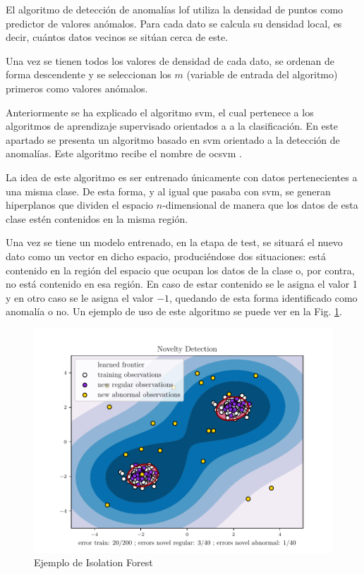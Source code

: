 
El algoritmo de detección de anomalías \acrfull{lof} \cite{cheng2019outlier} utiliza la densidad de puntos como predictor de valores anómalos. Para cada dato se calcula su densidad local, es decir, cuántos datos vecinos se sitúan cerca de este.

Una vez se tienen todos los valores de densidad de cada dato, se ordenan de forma descendente y se seleccionan los $m$ (variable de entrada del algoritmo) primeros como valores anómalos.


Anteriormente se ha explicado el algoritmo \acrshort{svm}, el cual pertenece a los algoritmos de aprendizaje supervisado orientados a a la clasificación. En este apartado se presenta un algoritmo basado en \acrshort{svm} orientado a la detección de anomalías. Este algoritmo recibe el nombre de \acrfull{ocsvm} \cite{li2003improving}.

La idea de este algoritmo es ser entrenado únicamente con datos pertenecientes a una misma clase. De esta forma, y al igual que pasaba con \acrshort{svm}, se generan hiperplanos que dividen el espacio $n$-dimensional de manera que los datos de esta clase estén contenidos en la misma región. 

Una vez se tiene un modelo entrenado, en la etapa de test, se situará el nuevo dato como un vector en dicho espacio, produciéndose dos situaciones: está contenido en la región del espacio que ocupan los datos de la clase o, por contra, no está contenido en esa región. En caso de estar contenido se le asigna el valor 1 y en otro caso se le asigna el valor $-1$, quedando de esta forma identificado como anomalía o no. Un ejemplo de uso de este algoritmo se puede ver en la Fig. \ref{fig:ex_scikit_ocsvm}.

\begin{figure}[htpb!]
    \centering
    \includegraphics[scale=0.7]{images/oc-svm.pdf}
    \caption{Ejemplo de Isolation Forest \cite{ex_scikit_ocsvm}}
    \label{fig:ex_scikit_ocsvm}
\end{figure}

